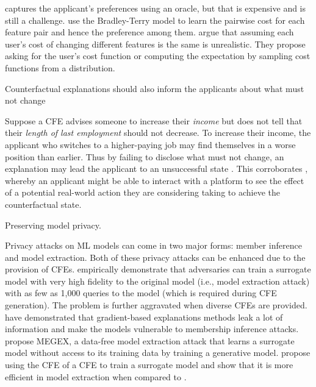 \progress
\citet{mahajan_preserving_2020} captures the applicant's preferences using an oracle, but that is expensive and is still a challenge. \citet{hima-beyond-recourse-globalcfe} use the Bradley-Terry model to learn the pairwise cost for each feature pair and hence the preference among them. 
\citet{user-specific-cost} argue that assuming each user's cost of changing different features is the same is unrealistic. They propose asking for the user's cost function or computing the expectation by sampling cost functions from a distribution. 

\begin{challenge}
Counterfactual explanations should also inform the applicants about what must not change
\end{challenge}
Suppose a CFE advises someone to increase their \emph{income} but does not tell that their \emph{length of last employment} should not decrease. To increase their income, the applicant who switches to a higher-paying job may find themselves in a worse position than earlier. Thus by failing to disclose what must not change, an explanation may lead the applicant to an unsuccessful state \citep{hidden_assumptions}. This corroborates , whereby an applicant might be able to interact with a platform to see the effect of a potential real-world action they are considering taking to achieve the counterfactual state. 

\begin{challenge}\label{ch:privacy}
Preserving model privacy. 
\end{challenge}
Privacy attacks on ML models can come in two major forms: member inference and model extraction. 
Both of these privacy attacks can be enhanced due to the provision of CFEs. \citet{modelprivacy-CFE} empirically demonstrate that adversaries can train a surrogate model with very high fidelity to the original model (i.e., model extraction attack) with as few as 1,000 queries to the model (which is required during CFE generation). The problem is further aggravated when diverse CFEs are provided. 
\citet{modelprivacy-generalxai} have demonstrated that gradient-based explanations methods leak a lot of information and make the models vulnerable to membership inference attacks. 
\citet{Miura2021MEGEX-privacy-attack-cfe} propose MEGEX, a data-free model extraction attack that learns a surrogate model without access to its training data by training a generative model. 
\citet{DualCF-model-extraction} propose using the CFE of a CFE to train a surrogate model and show that it is more efficient in model extraction when compared to \citep{modelprivacy-CFE}. 


